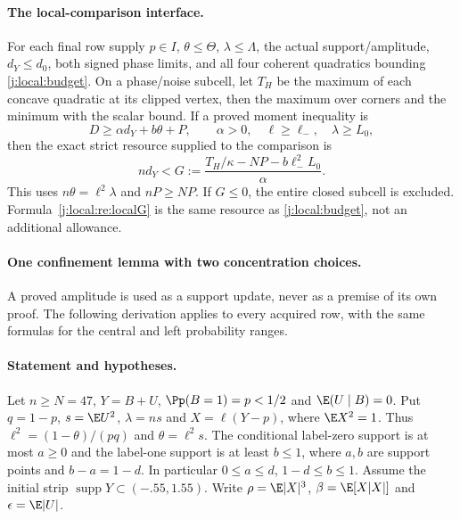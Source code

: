 \paragraph{The local-comparison interface.}
For each final row supply $p\in I$, $\theta\le\Theta$, $\lambda\le\Lambda$,
the actual support/amplitude, $d_Y\le d_0$, both signed phase limits,
and all four coherent quadratics bounding \eqref{j:local:budget}.
On a phase/noise subcell, let $T_H$ be the maximum of each concave
quadratic at its clipped vertex, then the maximum over corners and the
minimum with the scalar bound. If a proved moment inequality is
\[
 D\ge\alpha d_Y+b\theta+P,\qquad\alpha>0,
 \quad \ell\ge\ell_-,\quad\lambda\ge L_0,
\]
then the exact strict resource supplied to the comparison is
\begin{equation}\label{j:local:re:localG}
 nd_Y<G:=\frac{T_H/\kappa-NP-b\ell_-^2L_0}{\alpha}.
\end{equation}
This uses $n\theta=\ell^2\lambda$ and $nP\ge NP$. If $G\le0$,
the entire closed subcell is excluded. Formula~\eqref{j:local:re:localG} is
the same resource as \eqref{j:local:budget}, not an additional allowance.

\paragraph{One confinement lemma with two concentration choices.}\label{j:local:confinement}
A proved amplitude is used as a support update, never as a premise of
its own proof. The following derivation applies to every acquired row,
with the same formulas for the central and left probability ranges.
\paragraph{Statement and hypotheses.}
Let $n\ge N=47$, $Y=B+U$, $\Pp(B=1)=p<1/2$ and $\E(U\mid B)=0$.
Put $q=1-p$, $s=\E U^2$, $\lambda=ns$ and $X=\ell(Y-p)$, where
$\E X^2=1$. Thus $\ell^2=(1-\theta)/(pq)$ and $\theta=\ell^2s$.
The conditional label-zero support is at most $a\ge0$ and the label-one
support is at least $b\le1$, where $a,b$ are support points and
$b-a=1-d$. In particular $0\le a\le d$, $1-d\le b\le1$.
Assume the initial strip $\operatorname{supp}Y\subset(-.55,1.55)$.
Write $\rho=\E|X|^3$, $\beta=\E[X|X|]$ and $\epsilon=\E|U|$.


